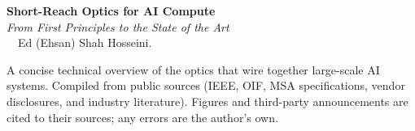 \newpage
\thispagestyle{empty}
\vspace*{\fill}
\begin{center}
  \textbf{\Large Short-Reach Optics for AI Compute} \\[0.5em]
  \textit{\large From First Principles to the State of the Art} \\[2em]

  \textcopyright\ \the\year\ Ed (Ehsan) Shah Hosseini.

  \vspace{1.5em}
  \begin{minipage}{0.85\textwidth}
  \small
  A concise technical overview of the optics that wire together large-scale AI
  systems. Compiled from public sources (IEEE, OIF, MSA specifications, vendor
  disclosures, and industry literature). Figures and third-party announcements
  are cited to their sources; any errors are the author's own.
  \end{minipage}
\end{center}
\vspace*{\fill}
\newpage
